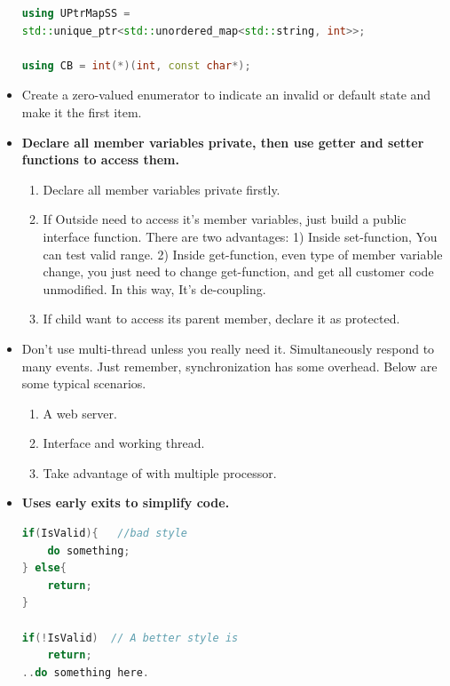 \documentclass[a4paper,12pt,twoside]{book}
\begin{document}
\begin{itemize}
\begin{lstlisting}[frame=single, language=c++]
using UPtrMapSS =
std::unique_ptr<std::unordered_map<std::string, int>>;
	
using CB = int(*)(int, const char*);
\end{lstlisting}
	
	\item Create a zero-valued enumerator to indicate an invalid or default state and make it the first item.
	
	\item \textbf{Declare all member variables private, then use getter and setter functions to access them.}
	\begin{enumerate}
		\item Declare all member variables private firstly.
		
		\item If Outside need to access it's member variables, just build a public interface function. There are two advantages: 1) Inside set-function, You can test valid range. 2) Inside get-function, even type of member variable change, you just need to change get-function, and get all customer code unmodified. In this way, It's de-coupling.
		
		\item If child want to access its parent member, declare it as protected.
		
	\end{enumerate}
	
	\item Don't use multi-thread unless you really need it. Simultaneously respond to many events. Just remember, synchronization has some overhead. Below are some typical scenarios.
	\begin{enumerate}
		\item A web server.
		\item Interface and working thread.
		\item Take advantage of with multiple processor.
	\end{enumerate}
	
	\item \textbf{Uses early exits to simplify code.}
	
\begin{lstlisting}[frame=single, language=c++]
if(IsValid){   //bad style
	do something;
} else{
	return;
}
	
if(!IsValid)  // A better style is
	return;
..do something here.
\end{lstlisting}
	

\end{itemize}
\end{document}
